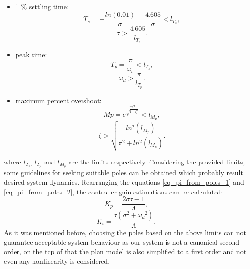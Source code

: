 \documentclass[12pt,english,twoside]{article}
\begin{document}
\begin{itemize}
	\item 1 \% settling time:
	\begin{equation}
	T_s = -\frac{ln(0.01)}{\sigma} = \frac{4.605}{\sigma} < l_{T_s},
	\end{equation}
	\begin{equation}
	\sigma > \frac{4.605}{l_{T_s}}.
	\end{equation}
	
	\item peak time:
	\begin{equation}
	T_p = \frac{\pi}{\omega_d} < l_{T_s},
	\end{equation}
	\begin{equation}
	\omega_d > \frac{\pi}{l_{T_p}}.
	\end{equation}
	
	\item maximum percent overshoot:
	\begin{equation}
	Mp = e^{\frac{-\zeta \pi}{\sqrt{1-\zeta^2}}}  < l_{M_p},
	\end{equation}
	\begin{equation}
	\zeta > \sqrt{\frac{ln^2(l_{M_p})}{\pi^2+ln^2(l_{M_p})}}.
	\end{equation}
\end{itemize}
where $l_{T_s}$, $l_{T_p}$ and $l_{M_p}$ are the limits respectively.
Considering the provided limits, some guidelines for seeking suitable poles can be obtained which probably result desired system dynamics. Rearranging the equations \ref{eq_pi_from_poles_1} and \ref{eq_pi_from_poles_2}, the controller gain estimations can be calculated:
\begin{equation}
K_p = \frac{2 \sigma \tau - 1}{A},
\end{equation}
\begin{equation}
K_i = \frac{\tau(\sigma^2 + {\omega_d}^2)}{A}.
\end{equation}
As it was mentioned before, choosing the poles based on the above limits can not guarantee acceptable system behaviour as our system is not a canonical second-order, on the top of that the plan model is also simplified to a first order and not even any nonlinearity is considered.
\end{document}
